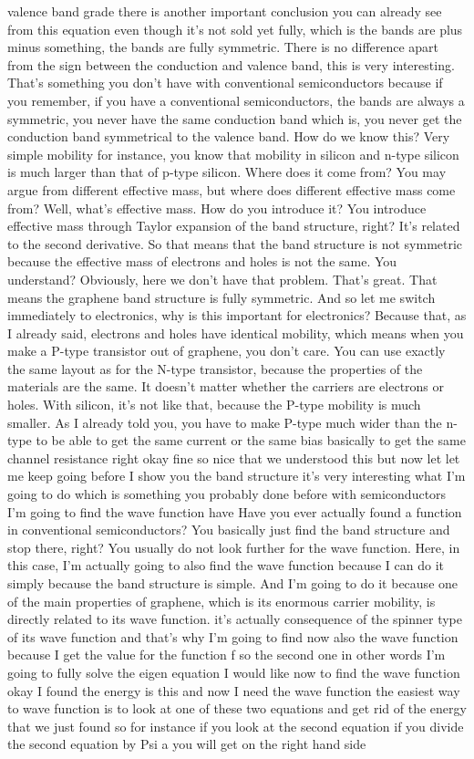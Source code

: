 valence band grade there is another important conclusion you can already see from this equation even though it's not sold yet fully, which is the bands are plus minus something, the bands are fully symmetric. There is no difference apart from the sign between the conduction and valence band, this is very interesting. That's something you don't have with conventional semiconductors because if you remember, if you have a conventional semiconductors, the bands are always a symmetric, you never have the same conduction band which is, you never get the conduction band symmetrical to the valence band. How do we know this? Very simple mobility for instance, you know that mobility in silicon and n-type silicon is much larger than that of p-type silicon. Where does it come from? You may argue from different effective mass, but where does different effective mass come from? Well, what's effective mass. How do you introduce it? You introduce effective mass through Taylor expansion of the band structure, right? It's related to the second derivative. So that means that the band structure is not symmetric because the effective mass of electrons and holes is not the same. You understand? Obviously, here we don't have that problem. That's great. That means the graphene band structure is fully symmetric. And so let me switch immediately to electronics, why is this important for electronics? Because that, as I already said, electrons and holes have identical mobility, which means when you make a P-type transistor out of graphene, you don't care. You can use exactly the same layout as for the N-type transistor, because the properties of the materials are the same. It doesn't matter whether the carriers are electrons or holes. With silicon, it's not like that, because the P-type mobility is much smaller. As I already told you, you have to make P-type much wider than the n-type to be able to get the same current or the same bias basically to get the same channel resistance right okay fine so nice that we understood this but now let let me keep going before I show you the band structure it's very interesting what I'm going to do which is something you probably done before with semiconductors I'm going to find the wave function have Have you ever actually found a function in conventional semiconductors? You basically just find the band structure and stop there, right? You usually do not look further for the wave function. Here, in this case, I'm actually going to also find the wave function because I can do it simply because the band structure is simple. And I'm going to do it because one of the main properties of graphene, which is its enormous carrier mobility, is directly related to its wave function. it's actually consequence of the spinner type of its wave function and that's why I'm going to find now also the wave function because I get the value for the function f so the second one in other words I'm going to fully solve the eigen equation I would like now to find the wave function okay I found the energy is this and now I need the wave function the easiest way to wave function is to look at one of these two equations and get rid of the energy that we just found so for instance if you look at the second equation if you divide the second equation by Psi a you will get on the right hand side 